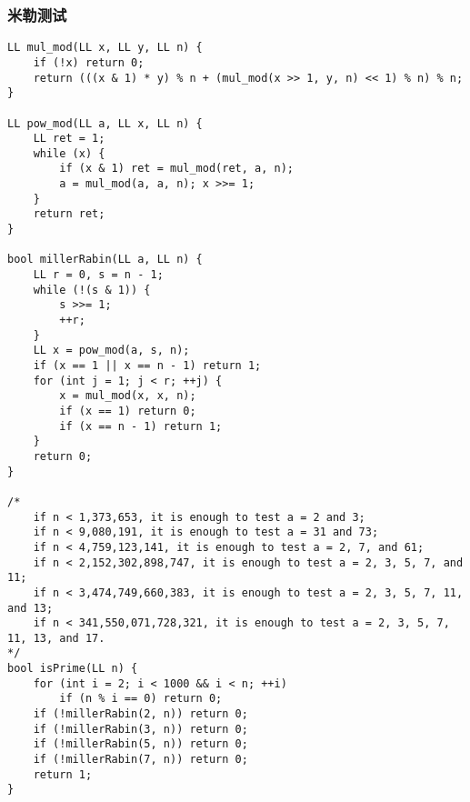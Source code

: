 \subsubsection{米勒测试}
\begin{verbatim}
LL mul_mod(LL x, LL y, LL n) {
	if (!x) return 0;
	return (((x & 1) * y) % n + (mul_mod(x >> 1, y, n) << 1) % n) % n;
}

LL pow_mod(LL a, LL x, LL n) {
	LL ret = 1;
	while (x) {
		if (x & 1) ret = mul_mod(ret, a, n);
		a = mul_mod(a, a, n); x >>= 1;
	}
	return ret;
}

bool millerRabin(LL a, LL n) {
	LL r = 0, s = n - 1;
	while (!(s & 1)) {
		s >>= 1;
		++r;
	}
	LL x = pow_mod(a, s, n);
	if (x == 1 || x == n - 1) return 1;
	for (int j = 1; j < r; ++j) {
		x = mul_mod(x, x, n);
		if (x == 1) return 0;
		if (x == n - 1) return 1;
	}
	return 0;
}

/*
	if n < 1,373,653, it is enough to test a = 2 and 3;
	if n < 9,080,191, it is enough to test a = 31 and 73;
	if n < 4,759,123,141, it is enough to test a = 2, 7, and 61;
	if n < 2,152,302,898,747, it is enough to test a = 2, 3, 5, 7, and 11;
	if n < 3,474,749,660,383, it is enough to test a = 2, 3, 5, 7, 11, and 13;
	if n < 341,550,071,728,321, it is enough to test a = 2, 3, 5, 7, 11, 13, and 17.
*/
bool isPrime(LL n) {
	for (int i = 2; i < 1000 && i < n; ++i)
		if (n % i == 0) return 0;
	if (!millerRabin(2, n)) return 0;
	if (!millerRabin(3, n)) return 0;
	if (!millerRabin(5, n)) return 0;
	if (!millerRabin(7, n)) return 0;
	return 1;
}
\end{verbatim}
